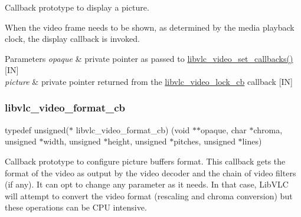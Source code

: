 Callback prototype to display a picture.

When the video frame needs to be shown, as determined by the media playback clock, the display callback is invoked.


\begin{DoxyParams}{Parameters}
{\em opaque} & private pointer as passed to \hyperlink{group__libvlc__media__player_ga612605f2e5c638d9f4ed59021d714bf0}{libvlc\+\_\+video\+\_\+set\+\_\+callbacks()} \mbox{[}IN\mbox{]} \\
\hline
{\em picture} & private pointer returned from the \hyperlink{group__libvlc__media__player_ga193de3e82f6de3f9d8f5ccd8b5f2aa98}{libvlc\+\_\+video\+\_\+lock\+\_\+cb} callback \mbox{[}IN\mbox{]} \\
\hline
\end{DoxyParams}
\mbox{\label{group__libvlc__media__player_gae46128c21d0d0151aca3ba017d1d6b35}} 
\subsubsection{\texorpdfstring{libvlc\+\_\+video\+\_\+format\+\_\+cb}{libvlc\_video\_format\_cb}}
{\footnotesize\ttfamily typedef unsigned($\ast$ libvlc\+\_\+video\+\_\+format\+\_\+cb) (void $\ast$$\ast$opaque, char $\ast$chroma, unsigned $\ast$width, unsigned $\ast$height, unsigned $\ast$pitches, unsigned $\ast$lines)}

Callback prototype to configure picture buffers format. This callback gets the format of the video as output by the video decoder and the chain of video filters (if any). It can opt to change any parameter as it needs. In that case, Lib\+V\+LC will attempt to convert the video format (rescaling and chroma conversion) but these operations can be C\+PU intensive.


